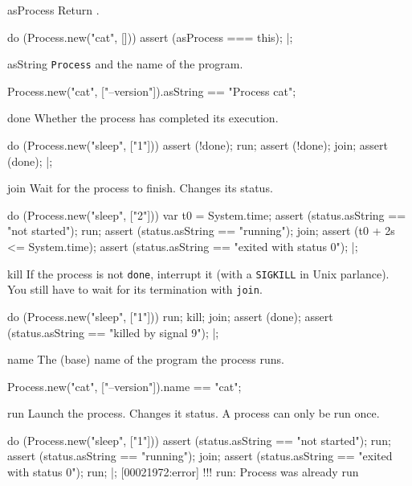 \begin{urbiscriptapi}
\item[asProcess] Return \this.
\begin{urbiscript}
do (Process.new("cat", []))
{
  assert (asProcess === this);
}|;
\end{urbiscript}

\item[asString] \lstinline|Process| and the name of the program.
\begin{urbiassert}
Process.new("cat", ["--version"]).asString
  == "Process cat";
\end{urbiassert}

\item[done] Whether the process has completed its execution.
\begin{urbiscript}
do (Process.new("sleep", ["1"]))
{
  assert (!done);
  run;
  assert (!done);
  join;
  assert (done);
}|;
\end{urbiscript}


\item[join] Wait for the process to finish.  Changes its status.
\begin{urbiscript}
do (Process.new("sleep", ["2"]))
{
  var t0 = System.time;
  assert (status.asString == "not started");
  run;
  assert (status.asString == "running");
  join;
  assert (t0 + 2s <= System.time);
  assert (status.asString == "exited with status 0");
}|;
\end{urbiscript}

\item[kill] If the process is not \lstinline|done|, interrupt it (with
  a \lstinline|SIGKILL| in Unix parlance).  You still have to wait for
  its termination with \lstinline|join|.
\begin{urbiscript}
do (Process.new("sleep", ["1"]))
{
  run;
  kill;
  join;
  assert (done);
  assert (status.asString == "killed by signal 9");
}|;
\end{urbiscript}


\item[name] The (base) name of the program the process runs.
\begin{urbiassert}
Process.new("cat", ["--version"]).name == "cat";
\end{urbiassert}

\item[run] Launch the process.  Changes it status.  A process can only
  be run once.
\begin{urbiscript}
do (Process.new("sleep", ["1"]))
{
  assert (status.asString == "not started");
  run;
  assert (status.asString == "running");
  join;
  assert (status.asString == "exited with status 0");
  run;
}|;
[00021972:error] !!! run: Process was already run
\end{urbiscript}


\end{urbiscriptapi}

